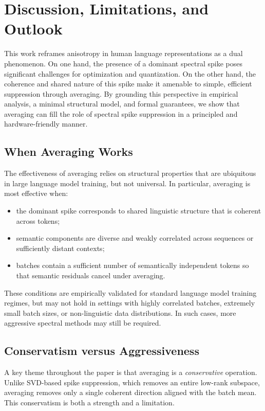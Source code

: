 \section{Discussion, Limitations, and Outlook}
\label{sec:discussion}

This work reframes anisotropy in human language representations as a dual
phenomenon.
On one hand, the presence of a dominant spectral spike poses significant
challenges for optimization and quantization.
On the other hand, the coherence and shared nature of this spike make it
amenable to simple, efficient suppression through averaging.
By grounding this perspective in empirical analysis, a minimal structural
model, and formal guarantees, we show that averaging can fill the role of
spectral spike suppression in a principled and hardware-friendly manner.

\subsection{When Averaging Works}

The effectiveness of averaging relies on structural properties that are
ubiquitous in large language model training, but not universal.
In particular, averaging is most effective when:
\begin{itemize}
  \item the dominant spike corresponds to shared linguistic structure that is
  coherent across tokens;
  \item semantic components are diverse and weakly correlated across sequences
  or sufficiently distant contexts;
  \item batches contain a sufficient number of semantically independent tokens
  so that semantic residuals cancel under averaging.
\end{itemize}

These conditions are empirically validated for standard language model training
regimes, but may not hold in settings with highly correlated batches, extremely
small batch sizes, or non-linguistic data distributions.
In such cases, more aggressive spectral methods may still be required.

\subsection{Conservatism versus Aggressiveness}

A key theme throughout the paper is that averaging is a \emph{conservative}
operation.
Unlike SVD-based spike suppression, which removes an entire low-rank subspace,
averaging removes only a single coherent direction aligned with the batch mean.
This conservatism is both a strength and a limitation.


